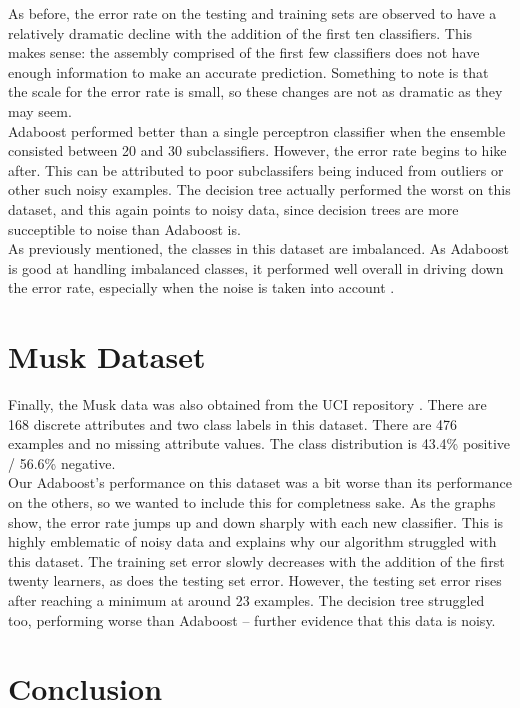 \documentclass{article}
\begin{document}
As before, the error rate on the testing and training sets are observed to have a relatively dramatic decline with the addition of the first ten classifiers. This makes sense: the assembly comprised of the first few classifiers does not have enough information to make an accurate prediction. Something to note is that the scale for the error rate is small, so these changes are not as dramatic as they may seem. \\

Adaboost performed better than a single perceptron classifier when the ensemble consisted between 20 and 30 subclassifiers. However, the error rate begins to hike after. This can be attributed to poor subclassifers being induced from outliers or other such noisy examples. The decision tree actually performed the worst on this dataset, and this again points to noisy data, since decision trees are more succeptible to noise than Adaboost is. \\

As previously mentioned, the classes in this dataset are imbalanced. As Adaboost is good at handling imbalanced classes, it performed well overall in driving down the error rate, especially when the noise is taken into account \cite{sun-kamel-wang}.

\section{Musk Dataset}

Finally, the Musk data was also obtained from the UCI repository \cite{musk}. There are 168 discrete attributes and two class labels in this dataset. There are 476 examples and no missing attribute values. The class distribution is 43.4\% positive / 56.6\% negative. \\

Our Adaboost's performance on this dataset was a bit worse than its performance on the others, so we wanted to include this for completness sake. As the graphs show, the error rate jumps up and down sharply with each new classifier. This is highly emblematic of noisy data and explains why our algorithm struggled with this dataset. The training set error slowly  decreases with the addition of the first twenty learners, as does the testing set error. However, the testing set error rises after reaching a minimum at around 23 examples. The decision tree struggled too, performing worse than Adaboost -- further evidence that this data is noisy.

\section{Conclusion}
\end{document}

